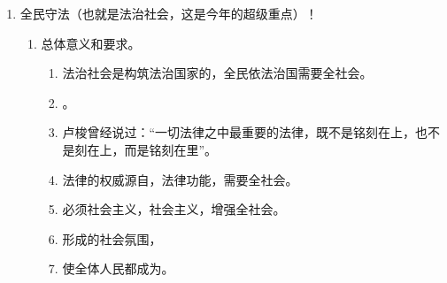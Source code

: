 \begin{enumerate}
\begin{enumerate}
\begin{enumerate}
                  \item 努力让人民群众在每一个司法案件中公平正义。
                \end{enumerate}
          \item 具体措施。
                \begin{enumerate}
                  \item 完善、优化司法职权配置，确保。
                  \item 推进，，
                  \item 健全的法律制度。
                  \item 保障，
                        坚持，依靠，通过公正司法。
                  \item 加强保障。
                  \item 加强对。
                \end{enumerate}
        \end{enumerate}
  \item 全民守法（也就是法治社会，这是今年的超级重点）！
        \begin{enumerate}
          \item 总体意义和要求。
                \begin{enumerate}
                  \item 法治社会是构筑法治国家的，全民依法治国需要全社会。
                  \item {}。
                  \item 卢梭曾经说过：“一切法律之中最重要的法律，既不是铭刻在上，也不是刻在上，而是铭刻在里”。
                  \item 法律的权威源自，法律功能，需要全社会。
                  \item 必须社会主义，社会主义，增强全社会。
                  \item 形成的社会氛围，
                  \item 使全体人民都成为。
                \end{enumerate}

\end{enumerate}
\end{enumerate}
